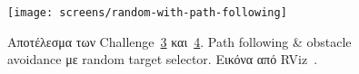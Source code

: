 \begin{figure}
    \centering
    \texttt{[image: screens/random-with-path-following]}
    \caption{Αποτέλεσμα των Challenge~\hyperref[section:ex3]{3} και~\hyperref[section:ex4]{4}. Path following \& obstacle avoidance με random target selector. Εικόνα από RViz~\protect\cite{rviz}.}
    \label{fig:random-with-path-following}
\end{figure}
